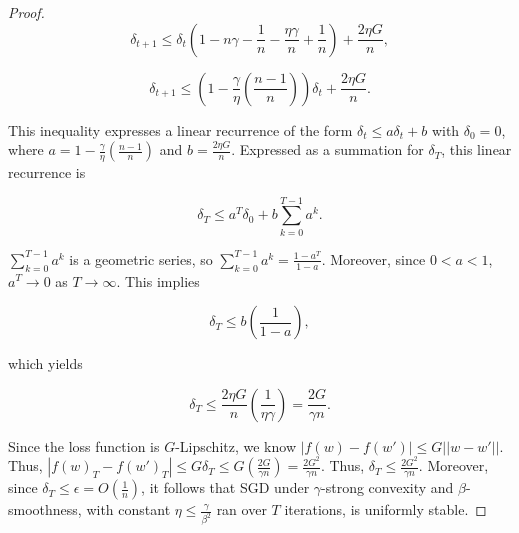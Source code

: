 \documentclass[10pt,a4paper]{amsart}
\begin{document}
\begin{proof}
\begin{equation}
\delta_{t+1} \leq \delta_t(1 - n\gamma - \frac{1}{n} - \frac{\eta\gamma}{n} + \frac{1}{n}) + \frac{2\eta G}{n},
\end{equation}

\begin{equation}
\delta_{t+1} \leq (1 - \frac{\gamma}{\eta}(\frac{n-1}{n}))\delta_t + \frac{2\eta G}{n}.
\end{equation}

\noindent
This inequality expresses a linear recurrence of the form $\delta_t \leq a\delta_t + b$ with $\delta_0 = 0$, where $a = 1 - \frac{\gamma}{\eta}(\frac{n-1}{n})$ and $b = \frac{2\eta G}{n}$. Expressed as a summation for $\delta_{T}$, this linear recurrence is

\begin{equation}
\delta_{T} \leq a^T\delta_0 + b \sum_{k=0}^{T-1}a^k.
\end{equation}

\noindent
$\sum_{k=0}^{T-1}a^k$ is a geometric series, so $\sum_{k=0}^{T-1}a^k = \frac{1-a^T}{1-a}$. Moreover, since $0 < a < 1$, $a^T \rightarrow 0$ as $T \rightarrow \infty$. This implies

\begin{equation}
\delta_T \leq b(\frac{1}{1-a}),
\end{equation}

\noindent
which yields

\begin{equation}
\delta_T \leq \frac{2 \eta G}{n}(\frac{1}{\eta \gamma}) = \frac{2G}{\gamma n}.
\end{equation}

\noindent
Since the loss function is $G$-Lipschitz, we know $|f(w) - f(w')| \leq G||w - w'||$. Thus, $|f(w)_T - f(w')_T| \leq G\delta_T \leq G(\frac{2G}{\gamma n}) = \frac{2G^2}{\gamma n}$. Thus, $\delta_T \leq \frac{2G^2}{\gamma n}$. Moreover, since $\delta_T \leq \epsilon = O(\frac{1}{n})$, it follows that SGD under $\gamma$-strong convexity and $\beta$-smoothness, with constant $\eta \leq \frac{\gamma}{\beta^2}$ ran over $T$ iterations, is uniformly stable. 
\end{proof}
\end{document}
